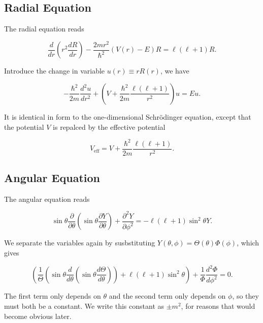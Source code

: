 \documentclass[a4paper,12pt]{report}
\begin{document}
\subsection{Radial Equation}

The radial equation reads 

\begin{equation}
  \frac{d}{dr} \left( r^2 \frac{dR}{dr}  \right) - \frac{2mr^2}{\hbar ^2}(V(r)-E)R = \ell (\ell +1)R.
\end{equation}

Introduce the change in variable \(u(r)\equiv rR(r)\), we have 

\begin{equation}
  -\frac{\hbar ^2}{2m} \frac{d^2u}{dr^2} + \left( V+ \frac{\hbar ^2}{2m} \frac{\ell (\ell +1)}{r^2}   \right)u = Eu. 
\end{equation}

It is identical in form to the one-dimensional Schrödinger equation, except that the potential \(V\) is repalced by the effective potential 

\begin{equation}
  V_{\text{eff} } = V + \frac{\hbar ^2}{2m} \frac{\ell (\ell +1)}{r^2}.   
\end{equation}

\subsection{Angular Equation}

The angular equation reads

\begin{equation}
  \sin \theta \frac{\partial }{\partial \theta } \left( \sin \theta \frac{\partial Y}{\partial \theta }  \right) + \frac{\partial^2 Y}{\partial \phi ^2} = -\ell (\ell +1)\sin ^2\theta Y. 
\end{equation}

We separate the variables again by susbstituting \(Y(\theta ,\phi ) = \Theta (\theta )\Phi (\phi )\), which gives 

\begin{equation}
  \left( \frac{1}{\Theta }\left( \sin \theta \frac{d}{d\theta }\left( \sin \theta \frac{d\Theta }{d\theta }  \right)  \right) + \ell (\ell +1)\sin ^2\theta   \right) + \frac{1}{\Phi } \frac{d^2\Phi }{d\phi ^2} = 0.  
\end{equation}

The first term only depends on \(\theta \) and the second term only depends on \(\phi \), so they must both be a constant. We write this constant as \(\pm m^2\), for reasons that would become obvious later.
\end{document}
